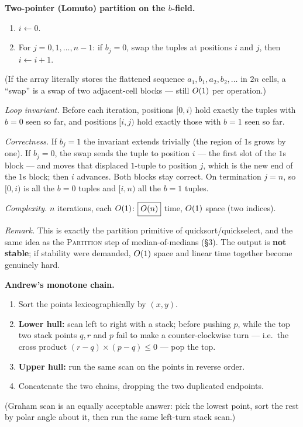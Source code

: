  \textbf{Two-pointer (Lomuto) partition on the $b$-field.}
\begin{enumerate}
  \item $i\leftarrow0$.
  \item For $j=0,1,\dots,n-1$: if $b_j=0$, swap the tuples at positions $i$ and $j$, then
        $i\leftarrow i+1$.
\end{enumerate}
(If the array literally stores the flattened sequence $a_1,b_1,a_2,b_2,\dots$ in $2n$ cells, a
``swap'' is a swap of two adjacent-cell blocks --- still $O(1)$ per operation.)

\emph{Loop invariant.} Before each iteration, positions $[0,i)$ hold exactly the tuples with
$b=0$ seen so far, and positions $[i,j)$ hold exactly those with $b=1$ seen so far.

\emph{Correctness.} If $b_j=1$ the invariant extends trivially (the region of $1$s grows by one).
If $b_j=0$, the swap sends the tuple to position $i$ --- the first slot of the $1$s block --- and
moves that displaced $1$-tuple to position $j$, which is the new end of the $1$s block; then $i$
advances. Both blocks stay correct. On termination $j=n$, so $[0,i)$ is all the $b=0$ tuples and
$[i,n)$ all the $b=1$ tuples.

\emph{Complexity.} $n$ iterations, each $O(1)$: $\boxed{O(n)}$ time, $O(1)$ space (two indices).

\emph{Remark.} This is exactly the partition primitive of quicksort/quickselect, and the same
idea as the \textsc{Partition} step of median-of-medians (\S3). The output is \textbf{not
stable}; if stability were demanded, $O(1)$ space and linear time together become genuinely hard.

 \textbf{Andrew's monotone chain.}
\begin{enumerate}
  \item Sort the points lexicographically by $(x,y)$.
  \item \textbf{Lower hull:} scan left to right with a stack; before pushing $p$, while the top
        two stack points $q,r$ and $p$ fail to make a counter-clockwise turn --- i.e.\ the cross
        product $(r-q)\times(p-q)\le0$ --- pop the top.
  \item \textbf{Upper hull:} run the same scan on the points in reverse order.
  \item Concatenate the two chains, dropping the two duplicated endpoints.
\end{enumerate}
(Graham scan is an equally acceptable answer: pick the lowest point, sort the rest by polar
angle about it, then run the same left-turn stack scan.)


